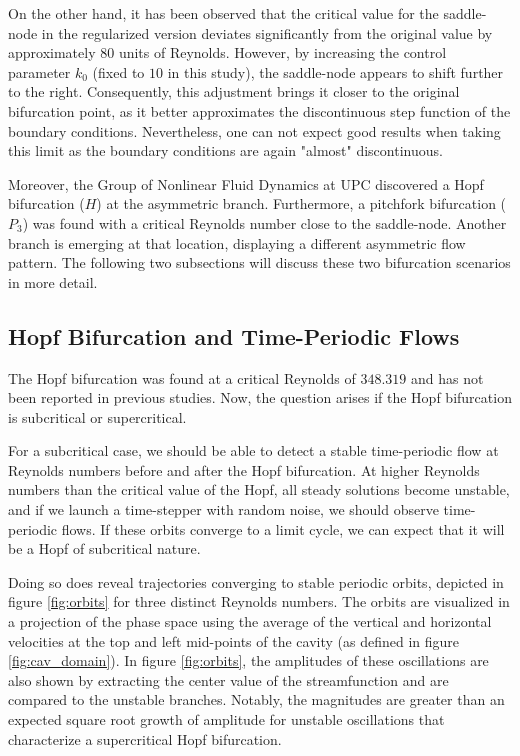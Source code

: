 On the other hand, it has been observed that the critical value for the
saddle-node in the regularized version deviates significantly from the original
value by approximately $80$ units of Reynolds. However, by increasing the
control parameter $k_0$ (fixed to $10$ in this study), the saddle-node appears
to shift further to the right. Consequently, this adjustment brings it closer
to the original bifurcation point, as it better approximates the discontinuous
step function of the boundary conditions. Nevertheless, one can not expect good
results when taking this limit as the boundary conditions are again "almost"
discontinuous.

Moreover, the Group of Nonlinear Fluid Dynamics at UPC discovered a Hopf
bifurcation ($H$) at the asymmetric branch. Furthermore, a pitchfork
bifurcation ($P_3$) was found with a critical Reynolds number close to the
saddle-node. Another branch is emerging at that location, displaying a
different asymmetric flow pattern. The following two subsections will discuss
these two bifurcation scenarios in more detail.

\subsection{Hopf Bifurcation and Time-Periodic Flows}

The Hopf bifurcation was found at a critical Reynolds of $348.319$ and has not
been reported in previous studies. Now, the question arises if the Hopf
bifurcation is subcritical or supercritical. 

For a subcritical case, we should be able to detect a stable time-periodic flow
at Reynolds numbers before and after the Hopf bifurcation. At higher Reynolds
numbers than the critical value of the Hopf, all steady solutions become
unstable, and if we launch a time-stepper with random noise, we should observe
time-periodic flows. If these orbits converge to a limit cycle, we can expect
that it will be a Hopf of subcritical nature.

Doing so does reveal trajectories converging to stable periodic orbits,
depicted in figure \ref{fig:orbits} for three distinct Reynolds numbers. The
orbits are visualized in a projection of the phase space using the average of
the vertical and horizontal velocities at the top and left mid-points of the
cavity (as defined in figure \ref{fig:cav_domain}). In figure \ref{fig:orbits},
the amplitudes of these oscillations are also shown by extracting the center
value of the streamfunction and are compared to the unstable branches. Notably,
the magnitudes are greater than an expected square root growth of amplitude for
unstable oscillations that characterize a supercritical Hopf bifurcation.

